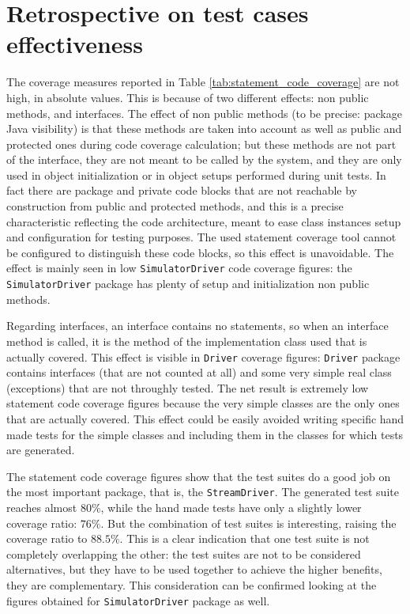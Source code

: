 \documentclass{article} \usepackage{times}
\newcommand{\lil}[1]{\texttt{\lstinline|#1|}}
\begin{document}
\section{Retrospective on test cases effectiveness}
\label{sec:test_cases_retrospectives}

The coverage measures reported in Table
\ref{tab:statement_code_coverage} are not high, in absolute
values. This is because of two different effects: non public methods,
and interfaces. The effect of non public methods (to be precise:
package Java visibility) is that these methods are taken into account
as well as public and protected ones during code coverage calculation;
but these methods are not part of the interface, they are not meant to
be called by the system, and they are only used in object
initialization or in object setups performed during unit tests. In
fact there are package and private code blocks that are not reachable
by construction from public and protected methods, and this is a
precise characteristic reflecting the code architecture, meant to ease
class instances setup and configuration for testing purposes. The used
statement coverage tool cannot be configured to distinguish these code
blocks, so this effect is unavoidable. The effect is mainly seen in
low \lil{SimulatorDriver} code coverage figures: the
\lil{SimulatorDriver} package has plenty of setup and initialization
non public methods.

Regarding interfaces, an interface contains no statements, so when an
interface method is called, it is the method of the implementation
class used that is actually covered. This effect is visible in
\lil{Driver} coverage figures: \lil{Driver} package contains
interfaces (that are not counted at all) and some very simple real
class (exceptions) that are not throughly tested. The net result is
extremely low statement code coverage figures because the very simple
classes are the only ones that are actually covered. This effect could
be easily avoided writing specific hand made tests for the simple
classes and including them in the classes for which tests are
generated.

The statement code coverage figures show that the test suites do a
good job on the most important package, that is, the
\lil{StreamDriver}. The generated test suite reaches almost $ 80 \% $,
while the hand made tests have only a slightly lower coverage ratio: $
76 \% $. But the combination of test suites is interesting, raising
the coverage ratio to $ 88.5 \% $. This is a clear indication that one
test suite is not completely overlapping the other: the test suites
are not to be considered alternatives, but they have to be used
together to achieve the higher benefits, they are complementary. This
consideration can be confirmed looking at the figures obtained for
\lil{SimulatorDriver} package as well.
\end{document}
